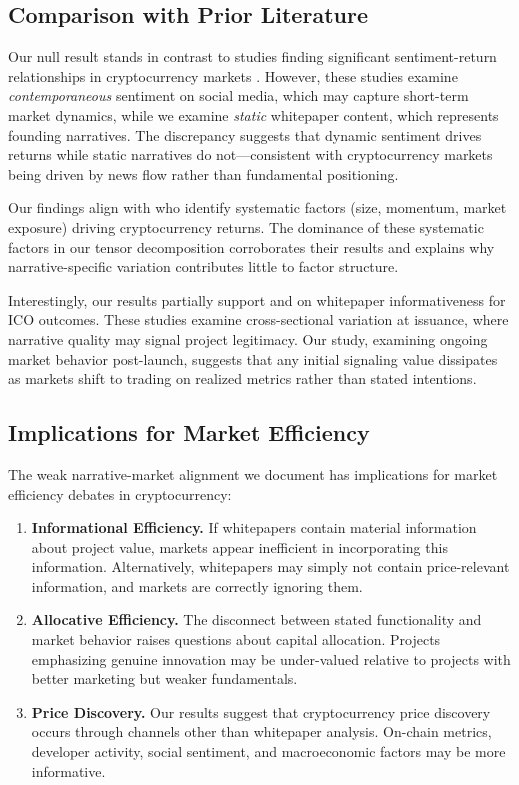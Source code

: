 \documentclass[11pt,twocolumn]{article}
\begin{document}
\subsection{Comparison with Prior Literature}

Our null result stands in contrast to studies finding significant sentiment-return relationships in cryptocurrency markets \citep{chen2019bitcoin, ante2023tweet}. However, these studies examine \textit{contemporaneous} sentiment on social media, which may capture short-term market dynamics, while we examine \textit{static} whitepaper content, which represents founding narratives. The discrepancy suggests that dynamic sentiment drives returns while static narratives do not---consistent with cryptocurrency markets being driven by news flow rather than fundamental positioning.

Our findings align with \citet{liu2021risks} who identify systematic factors (size, momentum, market exposure) driving cryptocurrency returns. The dominance of these systematic factors in our tensor decomposition corroborates their results and explains why narrative-specific variation contributes little to factor structure.

Interestingly, our results partially support \citet{howell2020initial} and \citet{fisch2019initial} on whitepaper informativeness for ICO outcomes. These studies examine cross-sectional variation at issuance, where narrative quality may signal project legitimacy. Our study, examining ongoing market behavior post-launch, suggests that any initial signaling value dissipates as markets shift to trading on realized metrics rather than stated intentions.

\subsection{Implications for Market Efficiency}

The weak narrative-market alignment we document has implications for market efficiency debates in cryptocurrency:

\begin{enumerate}
    \item \textbf{Informational Efficiency.} If whitepapers contain material information about project value, markets appear inefficient in incorporating this information. Alternatively, whitepapers may simply not contain price-relevant information, and markets are correctly ignoring them.

    \item \textbf{Allocative Efficiency.} The disconnect between stated functionality and market behavior raises questions about capital allocation. Projects emphasizing genuine innovation may be under-valued relative to projects with better marketing but weaker fundamentals.

    \item \textbf{Price Discovery.} Our results suggest that cryptocurrency price discovery occurs through channels other than whitepaper analysis. On-chain metrics, developer activity, social sentiment, and macroeconomic factors may be more informative.
\end{enumerate}
\end{document}
